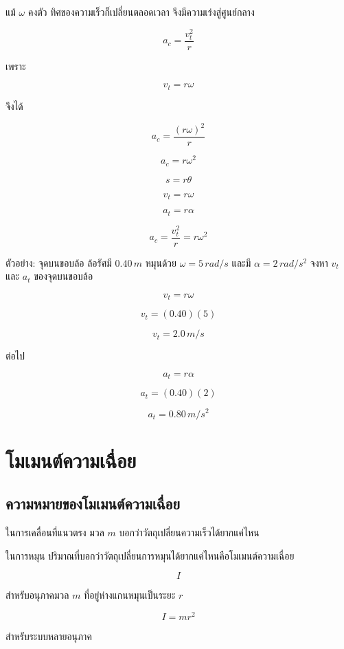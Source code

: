 แม้ $\omega$ คงตัว ทิศของความเร็วก็เปลี่ยนตลอดเวลา จึงมีความเร่งสู่ศูนย์กลาง

\[
a_c=\frac{v_t^2}{r}
\]

เพราะ

\[
v_t=r\omega
\]

จึงได้

\[
a_c=\frac{(r\omega)^2}{r}
\]

\[
a_c=r\omega^2
\]

\begin{tcolorbox}[title=สรุปความสัมพันธ์เชิงเส้นและเชิงมุม]
\[
s=r\theta
\]

\[
v_t=r\omega
\]

\[
a_t=r\alpha
\]

\[
a_c=\frac{v_t^2}{r}=r\omega^2
\]
\end{tcolorbox}

\begin{examplebox}{ตัวอย่าง: จุดบนขอบล้อ}
ล้อรัศมี $0.40\,\si{m}$ หมุนด้วย $\omega=5\,\si{rad/s}$ และมี $\alpha=2\,\si{rad/s^2}$ จงหา $v_t$ และ $a_t$ ของจุดบนขอบล้อ

\[
v_t=r\omega
\]

\[
v_t=(0.40)(5)
\]

\[
v_t=2.0\,\si{m/s}
\]

ต่อไป

\[
a_t=r\alpha
\]

\[
a_t=(0.40)(2)
\]

\[
a_t=0.80\,\si{m/s^2}
\]
\end{examplebox}

\section{โมเมนต์ความเฉื่อย}

\subsection{ความหมายของโมเมนต์ความเฉื่อย}

ในการเคลื่อนที่แนวตรง มวล $m$ บอกว่าวัตถุเปลี่ยนความเร็วได้ยากแค่ไหน

ในการหมุน ปริมาณที่บอกว่าวัตถุเปลี่ยนการหมุนได้ยากแค่ไหนคือโมเมนต์ความเฉื่อย

\[
I
\]

สำหรับอนุภาคมวล $m$ ที่อยู่ห่างแกนหมุนเป็นระยะ $r$

\[
I=mr^2
\]

สำหรับระบบหลายอนุภาค

